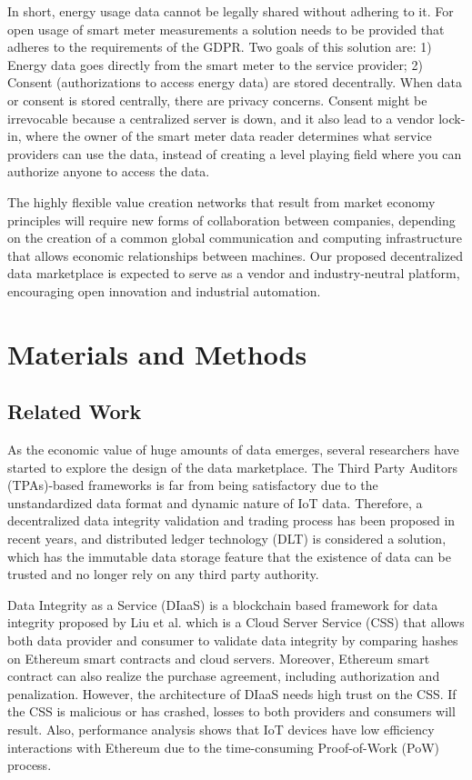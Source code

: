 \documentclass[journal,article,applsci,submit,moreauthors,pdftex]{Definitions/mdpi}
\begin{document}
In short, energy usage data cannot be legally shared without adhering to it. For open usage of smart meter measurements a solution needs to be provided that adheres to the requirements of the GDPR. Two goals of this solution are: 1) Energy data goes directly from the smart meter to the service provider; 2) Consent (authorizations to access energy data) are stored decentrally. When data or consent is stored centrally, there are privacy concerns. Consent might be irrevocable because a centralized server is down, and it also lead to a vendor lock-in, where the owner of the smart meter data reader determines what service providers can use the data, instead of creating a level playing field where you can authorize anyone to access the data.

The highly flexible value creation networks that result from market economy principles will require new forms of collaboration between companies, depending on the creation of a common global communication and computing infrastructure that allows economic relationships between machines. Our proposed decentralized data marketplace is expected to serve as a vendor and industry-neutral platform, encouraging open innovation and industrial automation.

\section{Materials and Methods}
\subsection{Related Work}
As the economic value of huge amounts of data emerges, several researchers have started to explore the design of the data marketplace. The Third Party Auditors (TPAs)-based frameworks\cite{TPA} is far from being satisfactory due to the unstandardized data format and dynamic nature of IoT data. Therefore, a decentralized data integrity validation and trading process has been proposed in recent years, and distributed ledger technology (DLT) is considered a solution, which has the immutable data storage feature that the existence of data can be trusted and no longer rely on any third party authority.

Data Integrity as a Service (DIaaS) is a blockchain based framework for data integrity proposed by Liu et al.\cite{DIaas} which is a Cloud Server Service (CSS) that allows both data provider and consumer to validate data integrity by comparing hashes on Ethereum smart contracts\cite{smartContract} and cloud servers. Moreover, Ethereum smart contract can also realize the purchase agreement, including authorization and penalization. However, the architecture of DIaaS needs high trust on the CSS. If the CSS is malicious or has crashed, losses to both providers and consumers will result. Also, performance analysis shows that IoT devices have low efficiency interactions with Ethereum due to the time-consuming Proof-of-Work (PoW) process.
\end{document}
